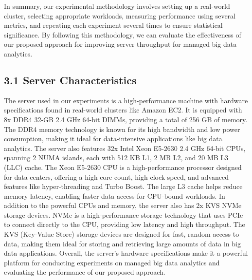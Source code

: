 \documentclass[twocolumn,10pt]{asme2e}
\begin{document}
In summary, our experimental methodology involves setting up a real-world cluster, selecting appropriate workloads, measuring performance using several metrics, and repeating each experiment several times to ensure statistical significance. By following this methodology, we can evaluate the effectiveness of our proposed approach for improving server throughput for managed big data analytics.

\subsection*{3.1 Server Characteristics}
The server used in our experiments is a high-performance machine with hardware specifications found in real-world clusters like Amazon EC2. It is equipped with 8x DDR4 32-GB 2.4 GHz 64-bit DIMMs, providing a total of 256 GB of memory. The DDR4 memory technology is known for its high bandwidth and low power consumption, making it ideal for data-intensive applications like big data analytics. The server also features 32x Intel Xeon E5-2630 2.4 GHz 64-bit CPUs, spanning 2 NUMA islands, each with 512 KB L1, 2 MB L2, and 20 MB L3 (LLC) cache. The Xeon E5-2630 CPU is a high-performance processor designed for data centers, offering a high core count, high clock speed, and advanced features like hyper-threading and Turbo Boost. The large L3 cache helps reduce memory latency, enabling faster data access for CPU-bound workloads. In addition to the powerful CPUs and memory, the server also has 2x KVS NVMe storage devices. NVMe is a high-performance storage technology that uses PCIe to connect directly to the CPU, providing low latency and high throughput. The KVS (Key-Value Store) storage devices are designed for fast, random access to data, making them ideal for storing and retrieving large amounts of data in big data applications. Overall, the server's hardware specifications make it a powerful platform for conducting experiments on managed big data analytics and evaluating the performance of our proposed approach. 
\end{document}
